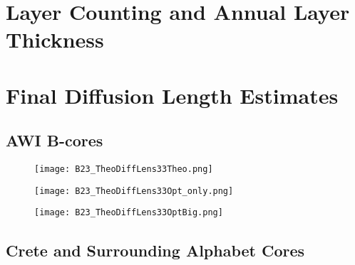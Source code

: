 \documentclass[../../CompleteThesis2/Complete_2ndDraft]{subfiles}
\begin{document}
\section[Annual Layer Thickness]{Layer Counting and Annual Layer Thickness}



\section[Diffusion Lengths]{Final Diffusion Length Estimates}

\subsection[AWI B-cores]{AWI B-cores}
\label{Sec:Results_AWIBcores}




\begin{figure}[h]
	\centering
	\texttt{[image: B23\_TheoDiffLens33Theo.png]}
	\caption[]{}
	\label{fig:B23_BD_Theo}
\end{figure}

\begin{figure}[h]
	\centering
	\texttt{[image: B23\_TheoDiffLens33Opt\_only.png]}
	\caption[]{}
	\label{fig:B23_BD_OptOnly}
\end{figure}

\begin{figure}[h]
	\centering
	\texttt{[image: B23\_TheoDiffLens33OptBig.png]}
	\caption[]{}
	\label{fig:B23_BD_OptBig}
\end{figure}











\subsection[Alphabet Cores]{Crete and Surrounding Alphabet Cores}
\label{Sec:Results_AlphabetCores}
\end{document}
